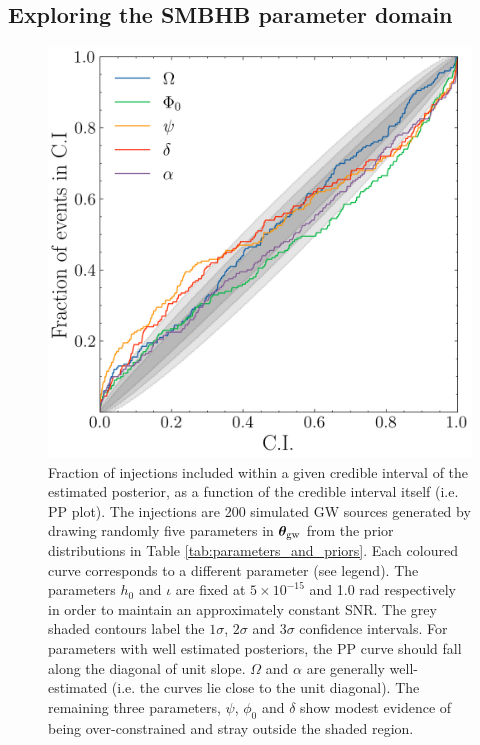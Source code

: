 \documentclass[fleqn,usenatbib,useAMS]{mnras}
\begin{document}
\subsection{Exploring the SMBHB parameter domain} \label{sec:parameter_space} 
\begin{figure}
	\centering
	\includegraphics[width=\columnwidth]{images/pp_plot_canonical500}
	\caption{Fraction of injections included within a given credible interval of the estimated posterior, as a function of the credible interval itself (i.e. PP plot). The injections are 200 simulated GW sources generated by drawing randomly five parameters in $\boldsymbol{\theta}_{\rm gw}$ from the prior distributions in Table \ref{tab:parameters_and_priors}. Each coloured curve corresponds to a different parameter (see legend). The parameters $h_0$ and $\iota$ are fixed at $5 \times 10^{-15}$ and 1.0 rad respectively in order to maintain an approximately constant SNR. The grey shaded contours label the $1\sigma$, $2\sigma$ and 3$\sigma$ confidence intervals. For parameters with well estimated posteriors, the PP curve should fall along the diagonal of unit slope. $\Omega$ and $\alpha$ are generally well-estimated (i.e. the curves lie close to the unit diagonal). The remaining three parameters, $\psi$, $\phi_0$ and $\delta$ show modest evidence of being over-constrained and stray outside the shaded region.}
	\label{fig:parameter_space}
\end{figure}
\end{document}
